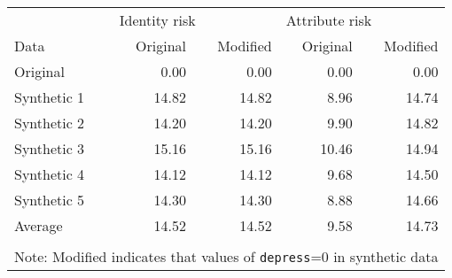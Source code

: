\begin{tabular}{lrrrr}
   
\toprule & 
\multicolumn{2}{l}{Identity risk} &
\multicolumn{2}{l}{Attribute risk}
\\  
 
\cmidrule(lr){2-3}
\cmidrule(lr){4-5}
 
Data & Original & Modified & Original & Modified
\\ 

\midrule
Original & 0.00 & 0.00 & 0.00 & 0.00 \\ 
  Synthetic 1 & 14.82 & 14.82 & 8.96 & 14.74 \\ 
  Synthetic 2 & 14.20 & 14.20 & 9.90 & 14.82 \\ 
  Synthetic 3 & 15.16 & 15.16 & 10.46 & 14.94 \\ 
  Synthetic 4 & 14.12 & 14.12 & 9.68 & 14.50 \\ 
  Synthetic 5 & 14.30 & 14.30 & 8.88 & 14.66 \\ 
  Average & 14.52 & 14.52 & 9.58 & 14.73 \\ 
   \bottomrule \\[-1.8ex] \multicolumn{5}{p{2.5in}}{Note: Modified indicates that values of \texttt{depress}=0  in synthetic data} 
\end{tabular}
